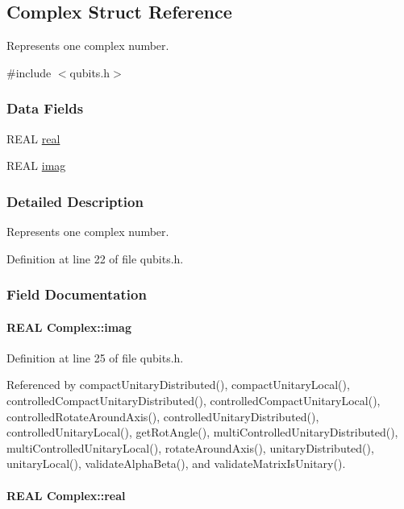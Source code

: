 \hypertarget{structComplex}{
\subsection{Complex Struct Reference}
\label{structComplex}
}


Represents one complex number.  


{\ttfamily \#include $<$qubits.h$>$}\subsubsection*{Data Fields}
\begin{DoxyCompactItemize}
\item 
REAL \hyperlink{structComplex_a479ad939835457595fcca3ca55c06283}{real}
\item 
REAL \hyperlink{structComplex_a1151948284b21c0052f203f23ab931d9}{imag}
\end{DoxyCompactItemize}


\subsubsection{Detailed Description}
Represents one complex number. 

Definition at line 22 of file qubits.h.

\subsubsection{Field Documentation}
\hypertarget{structComplex_a1151948284b21c0052f203f23ab931d9}{
\paragraph[{imag}]{\setlength{\rightskip}{0pt plus 5cm}REAL {\bf Complex::imag}}\hfill}
\label{structComplex_a1151948284b21c0052f203f23ab931d9}


Definition at line 25 of file qubits.h.

Referenced by compactUnitaryDistributed(), compactUnitaryLocal(), controlledCompactUnitaryDistributed(), controlledCompactUnitaryLocal(), controlledRotateAroundAxis(), controlledUnitaryDistributed(), controlledUnitaryLocal(), getRotAngle(), multiControlledUnitaryDistributed(), multiControlledUnitaryLocal(), rotateAroundAxis(), unitaryDistributed(), unitaryLocal(), validateAlphaBeta(), and validateMatrixIsUnitary().\hypertarget{structComplex_a479ad939835457595fcca3ca55c06283}{
\paragraph[{real}]{\setlength{\rightskip}{0pt plus 5cm}REAL {\bf Complex::real}}\hfill}
\label{structComplex_a479ad939835457595fcca3ca55c06283}


